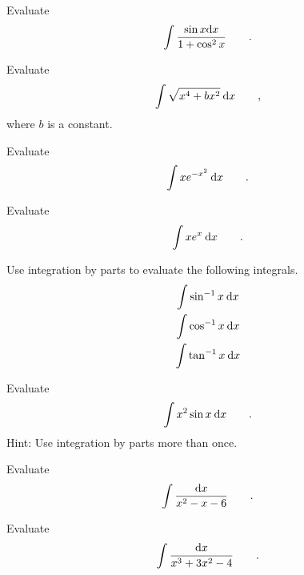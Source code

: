\begin{hwsection}
\begin{hw}
Evaluate
\begin{equation*}
  \int \frac{\sin x \textup{d} x}{1+\cos^2 x} \qquad .
\end{equation*}
\end{hw}

\begin{hw}
Evaluate
\begin{equation*}
  \int \sqrt{x^4+bx^2} \:\textup{d} x \qquad ,
\end{equation*}
where $b$ is a constant.
\end{hw}

\begin{hw}
Evaluate
\begin{equation*}
  \int x e^{-x^2} \:\textup{d} x \qquad .
\end{equation*}
\end{hw}

\begin{hw}
Evaluate
\begin{equation*}
  \int x e^x \:\textup{d} x \qquad .
\end{equation*}
\end{hw}

\begin{hw}
Use integration by parts to evaluate the following integrals.
\begin{gather*}
  \int \sin^{-1} x\:\textup{d} x \\
  \int \cos^{-1} x\:\textup{d} x \\
  \int \tan^{-1} x\:\textup{d} x 
\end{gather*}
\end{hw}

\begin{hw}
Evaluate
\begin{equation*}
  \int x^2 \sin x \:\textup{d} x \qquad .
\end{equation*}
Hint: Use integration by parts more than once.
\end{hw}

\begin{hw}
Evaluate
\begin{equation*}
  \int \frac{\textup{d} x}{x^2-x-6} \qquad .
\end{equation*}
\end{hw}

\begin{hw}
Evaluate
\begin{equation*}
  \int \frac{\textup{d} x}{x^3+3x^2-4} \qquad .
\end{equation*}
\end{hw}


\end{hwsection}

